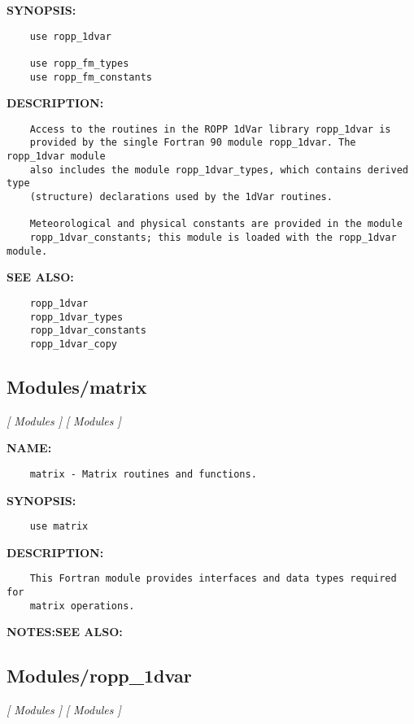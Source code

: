\label{ch:robo15}
\label{ch:Interface_Modules}
\textbf{SYNOPSIS:}\hspace{0.08in}\begin{Verbatim}
    use ropp_1dvar

    use ropp_fm_types
    use ropp_fm_constants
\end{Verbatim}
\textbf{DESCRIPTION:}\hspace{0.08in}\begin{Verbatim}
    Access to the routines in the ROPP 1dVar library ropp_1dvar is
    provided by the single Fortran 90 module ropp_1dvar. The ropp_1dvar module
    also includes the module ropp_1dvar_types, which contains derived type
    (structure) declarations used by the 1dVar routines.

    Meteorological and physical constants are provided in the module
    ropp_1dvar_constants; this module is loaded with the ropp_1dvar module.
\end{Verbatim}
\textbf{SEE ALSO:}\hspace{0.08in}\begin{Verbatim}
    ropp_1dvar
    ropp_1dvar_types
    ropp_1dvar_constants
    ropp_1dvar_copy
\end{Verbatim}
\subsection{Modules/matrix}
\textsl{[ Modules ]}
\textsl{[ Modules ]}

\label{ch:robo35}
\label{ch:Modules_matrix}
\textbf{NAME:}\hspace{0.08in}\begin{Verbatim}
    matrix - Matrix routines and functions.
\end{Verbatim}
\textbf{SYNOPSIS:}\hspace{0.08in}\begin{Verbatim}
    use matrix
\end{Verbatim}
\textbf{DESCRIPTION:}\hspace{0.08in}\begin{Verbatim}
    This Fortran module provides interfaces and data types required for
    matrix operations.
\end{Verbatim}
\textbf{NOTES:}\hspace{0.08in}\textbf{SEE ALSO:}\hspace{0.08in}\subsection{Modules/ropp\_1dvar}
\textsl{[ Modules ]}
\textsl{[ Modules ]}

